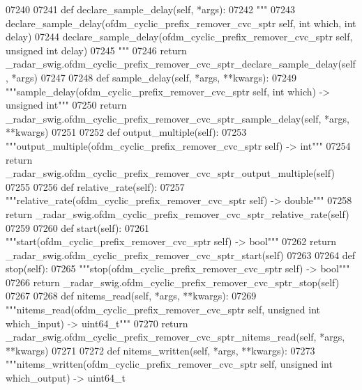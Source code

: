\begin{DoxyCode}
{{{{{{{{{{{{{{{{{{{{{{{{07240 
07241     \textcolor{keyword}{def }declare_sample_delay(self, *args):
07242         \textcolor{stringliteral}{"""}
07243 \textcolor{stringliteral}{        declare\_sample\_delay(ofdm\_cyclic\_prefix\_remover\_cvc\_sptr self, int which, int delay)}
07244 \textcolor{stringliteral}{        declare\_sample\_delay(ofdm\_cyclic\_prefix\_remover\_cvc\_sptr self, unsigned int delay)}
07245 \textcolor{stringliteral}{        """}
07246         \textcolor{keywordflow}{return} \_radar\_swig.ofdm\_cyclic\_prefix\_remover\_cvc\_sptr\_declare\_sample\_delay(self, *args)
07247 
07248     \textcolor{keyword}{def }sample_delay(self, *args, **kwargs):
07249         \textcolor{stringliteral}{"""sample\_delay(ofdm\_cyclic\_prefix\_remover\_cvc\_sptr self, int which) -> unsigned int"""}
07250         \textcolor{keywordflow}{return} \_radar\_swig.ofdm\_cyclic\_prefix\_remover\_cvc\_sptr\_sample\_delay(self, *args, **kwargs)
07251 
07252     \textcolor{keyword}{def }output_multiple(self):
07253         \textcolor{stringliteral}{"""output\_multiple(ofdm\_cyclic\_prefix\_remover\_cvc\_sptr self) -> int"""}
07254         \textcolor{keywordflow}{return} \_radar\_swig.ofdm\_cyclic\_prefix\_remover\_cvc\_sptr\_output\_multiple(self)
07255 
07256     \textcolor{keyword}{def }relative_rate(self):
07257         \textcolor{stringliteral}{"""relative\_rate(ofdm\_cyclic\_prefix\_remover\_cvc\_sptr self) -> double"""}
07258         \textcolor{keywordflow}{return} \_radar\_swig.ofdm\_cyclic\_prefix\_remover\_cvc\_sptr\_relative\_rate(self)
07259 
07260     \textcolor{keyword}{def }start(self):
07261         \textcolor{stringliteral}{"""start(ofdm\_cyclic\_prefix\_remover\_cvc\_sptr self) -> bool"""}
07262         \textcolor{keywordflow}{return} \_radar\_swig.ofdm\_cyclic\_prefix\_remover\_cvc\_sptr\_start(self)
07263 
07264     \textcolor{keyword}{def }stop(self):
07265         \textcolor{stringliteral}{"""stop(ofdm\_cyclic\_prefix\_remover\_cvc\_sptr self) -> bool"""}
07266         \textcolor{keywordflow}{return} \_radar\_swig.ofdm\_cyclic\_prefix\_remover\_cvc\_sptr\_stop(self)
07267 
07268     \textcolor{keyword}{def }nitems_read(self, *args, **kwargs):
07269         \textcolor{stringliteral}{"""nitems\_read(ofdm\_cyclic\_prefix\_remover\_cvc\_sptr self, unsigned int which\_input) -> uint64\_t"""}
07270         \textcolor{keywordflow}{return} \_radar\_swig.ofdm\_cyclic\_prefix\_remover\_cvc\_sptr\_nitems\_read(self, *args, **kwargs)
07271 
07272     \textcolor{keyword}{def }nitems_written(self, *args, **kwargs):
07273         \textcolor{stringliteral}{"""nitems\_written(ofdm\_cyclic\_prefix\_remover\_cvc\_sptr self, unsigned int which\_output) -> uint64\_t
}}}}}}}}}}}}}}}}}}}}}}}}}
\end{DoxyCode}
